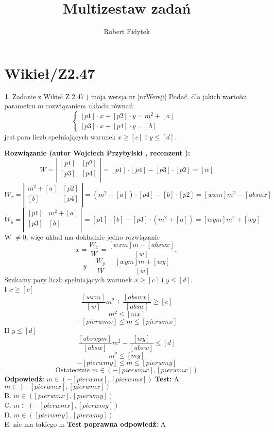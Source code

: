 \documentclass[12pt, a4paper]{article}
\title{Multizestaw zadań}
\author{Robert Fidytek}
\date{}
\theoremstyle{definition} %
\newtheorem{zad}{}
\newcommand{\kategoria}[1]{\section{#1}} %
\newcommand{\zadStart}[1]{\begin{zad}#1\newline} %
\newcommand{\zadStop}{\end{zad}}   %
\newcommand{\rozwStart}[2]{\noindent \textbf{Rozwiązanie (autor #1 , recenzent #2): }\newline} %
\newcommand{\rozwStop}{\newline}                                            %
\newcommand{\odpStart}{\noindent \textbf{Odpowiedź:}\newline}    %
\newcommand{\odpStop}{\newline}                                             %
\newcommand{\testStart}{\noindent \textbf{Test:}\newline} %
\newcommand{\testStop}{\newline} %
\newcommand{\kluczStart}{\noindent \textbf{Test poprawna odpowiedź:}\newline} %
\newcommand{\kluczStop}{\newline} %
\begin{document}
\maketitle


\kategoria{Wikieł/Z2.47}
\zadStart{Zadanie z Wikieł Z 2.47 ) moja wersja nr [nrWersji]}
Podać, dla jakich wartości parametru $m$ rozwiązaniem układu równań:
$$
 \left\{ \begin{array}{ll}
[p1]\cdot x+[p2]\cdot y=m^{2}+[a] & \\
{[p3]}\cdot x+[p4]\cdot y=[b]  & 
\end{array} \right.
$$
jest para liczb spełniających warunek $x\geq [c]$ i $y\leq[d]$.
\zadStop
\rozwStart{Wojciech Przybylski}{}
$$
W =
\left| \begin{array}{ccc}
[p1] & [p2]  \\
{[p3]} & [p4]  \\
\end{array} \right| =[p1]\cdot[p4]-[p3]\cdot[p2]=[w]
$$
$$
W_{x} =
\left| \begin{array}{ccc}
m^{2}+[a] & [p2]  \\
{[b]} & [p4]  \\
\end{array} \right| =(m^{2}+[a])\cdot[p4]-[b]\cdot[p2]=[wxm]m^{2}-[abswx]
$$
$$
W_{y} =
\left| \begin{array}{ccc}
[p1] & m^{2}+[a] \\
{[p3]} & [b]  \\
\end{array} \right| =[p1]\cdot[b]-[p3]\cdot(m^{2}+[a])=[wym]m^{2}+[wy]
$$
W $\neq 0$, więc układ ma dokładnie jedno rozwiązanie
$$x=\frac{W_{x}}{W}=\frac{[wxm]m-[abswx]}{[w]},$$
$$y=\frac{W_{y}}{W}=\frac{[wym]m+[wy]}{[w]}$$
Szukamy pary liczb  spełniających warunek $x\geq [c]$ i $y\leq[d]$.\\
I $x\geq [c]$
$$\frac{[wxm]}{[w]}m^{2}+\frac{[abswx]}{[absw]}\geq[c]$$
$$m^{2}\leq[mx]$$
$$-[pierwmx]\leq m\leq[pierwmx]$$
II $y\leq[d]$
$$\frac{[abswym]}{[absw]}m^2-\frac{[wy]}{[absw]}\leq[d]$$
$$m^{2}\leq[my]$$
$$-[pierwmy]\leq m\leq[pierwmy]$$
$$\mbox{Ostatecznie }m\in(-[pierwmx],[pierwmx])$$
\rozwStop
\odpStart
$m\in(-[pierwmx],[pierwmx])$
\odpStop
\testStart
A. $m\in(-[pierwmx],[pierwmx])$\\
B. $m\in([pierwmx],[pierwmy])$\\
C. $m\in(-[pierwmx],[pierwmy])$\\
D. $m\in([pierwmy],[pierwmy])$\\
E. nie ma takiego m 
\testStop
\kluczStart
A
\kluczStop
\end{document}
